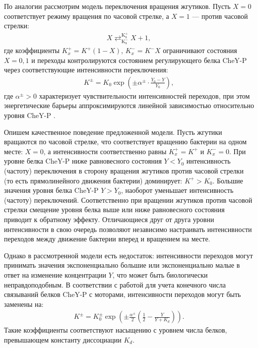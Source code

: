 По аналогии рассмотрим модель переключения вращения жгутиков. Пусть $X = 0$ соответствует режиму вращения по часовой стрелке, а $X = 1$ — против часовой стрелки:
\begin{equation}
    \begin{aligned}
        X \mathrel{\mathop{\rightleftarrows}^{\mathrm{K_{x}^{+}}}_{\mathrm{K_{x}^{-}}}} X + 1,
    \label{eq:turning}
    \end{aligned}
\end{equation}
где коэффициенты $K_x^{+}=K^{+}(1-X)$, $K_x^{-}=K^{-}X$ ограничивают состояния $X={0, 1}$ и переходы контролируются состоянием регулирующего белка CheY-P через соответствующие интенсивности переключения:
\begin{equation}
    \begin{aligned}
        K^{\pm}=K_0 \exp(\pm\alpha^\pm \cdot \frac{Y_0-Y}{Y_0}),
    \label{eq:turning-rates}
    \end{aligned}
\end{equation}
где $\alpha^\pm>0$ характеризует чувствительности интенсивностей переходов, при этом энергетические барьеры аппроксимируются линейной зависимостью относительно уровня CheY-P \cite{khan_steady-state_1980}.

Опишем качественное поведение предложенной модели. Пусть жгутики вращаются по часовой стрелке, что соответствует вращению бактерии на одном месте: $X=0$, а интенсивности соответственно равны $K_x^{+}=K^{+}$ и $K_x^{-}=0$. При уровне белка CheY-P ниже равновесного состояния $Y<Y_0$ интенсивность (частоту) переключения в сторону вращения жгутиков против часовой стрелки (то есть прямолинейного движения бактерии) доминирует: $K^{+}>K_0$. Большие значения уровня белка CheY-P $Y>Y_0$, наоборот уменьшает интенсивность (частоту) переключений. Соответственно при вращении жгутиков против часовой стрелки смещение уровня белка выше или ниже равновесного состояния приводит к обратному эффекту. Отличающиеся друг от друга уровни интенсивности в свою очередь позволяют независимо настраивать интенсивности переходов между движение бактерии вперед и вращением на месте.

Однако в рассмотренной модели есть недостаток: интенсивности переходов могут принимать значения экспоненциально большие или экспоненциально малые в ответ на изменение концентрации $Y$, что может быть биологически неправдоподобным. В соответствии с работой \cite{frankel_adaptability_2014} для учета конечного числа связываний белков CheY-P с моторами, интенсивности переходов могут быть заменены на:
\begin{equation}
    \begin{aligned}
        K^{\pm}=K_0^{\pm} \exp \left (\pm\frac{\alpha^\pm}{2} \left (\frac{1}{2} - \frac{Y}{Y+K_d} \right ) \right ).
    \label{eq:turning-rates-kd}
    \end{aligned}
\end{equation}
Такие коэффициенты соответствуют насыщению с уровнем числа белков, превышающем константу диссоциации $K_d$.

